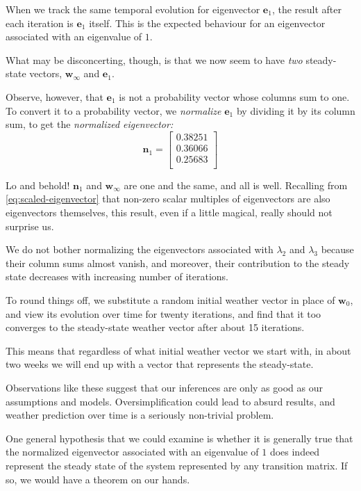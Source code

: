 \documentclass[
  11pt,
  a4paper,
]{article}
\begin{document}
When we track the same temporal evolution for eigenvector
\(\symbf{e}_{1}\), the result after each iteration is \(\symbf{e}_{1}\)
itself. This is the expected behaviour for an eigenvector associated
with an eigenvalue of \(1\).

What may be disconcerting, though, is that we now seem to have
\emph{two} steady-state vectors, \(\symbf{w}_{\infty}\) and
\(\symbf{e}_{1}\).

Observe, however, that \(\symbf{e}_{1}\) is not a probability vector
whose columns sum to one. To convert it to a probability vector, we
\emph{normalize} \(\symbf{e}_{1}\) by dividing it by its column sum, to
get the \emph{normalized eigenvector:} \begin{equation}
\symbf{n}_{1} = \begin{bmatrix}
0.38251\\
0.36066\\
0.25683\\
\end{bmatrix}
\label{eq:normalized-eigenvector-1}\end{equation}

Lo and behold! \(\symbf{n}_{1}\) and \(\symbf{w}_{\infty}\) are one and
the same, and all is well. Recalling from \cref{eq:scaled-eigenvector}
that non-zero scalar multiples of eigenvectors are also eigenvectors
themselves, this result, even if a little magical, really should not
surprise us.

We do not bother normalizing the eigenvectors associated with
\(\lambda_{2}\) and \(\lambda_{3}\) because their column sums almost
vanish, and moreover, their contribution to the steady state decreases
with increasing number of iterations.

To round things off, we substitute a random initial weather vector in
place of \(\symbf{w}_{0}\), and view its evolution over time for twenty
iterations, and find that it too converges to the steady-state weather
vector after about 15 iterations.

This means that regardless of what initial weather vector we start with,
in about two weeks we will end up with a vector that represents the
steady-state.

Observations like these suggest that our inferences are only as good as
our assumptions and models. Oversimplification could lead to absurd
results, and weather prediction over time is a seriously non-trivial
problem.

One general hypothesis that we could examine is whether it is generally
true that the normalized eigenvector associated with an eigenvalue of
\(1\) does indeed represent the steady state of the system represented
by any transition matrix. If so, we would have a theorem on our hands.
\end{document}
